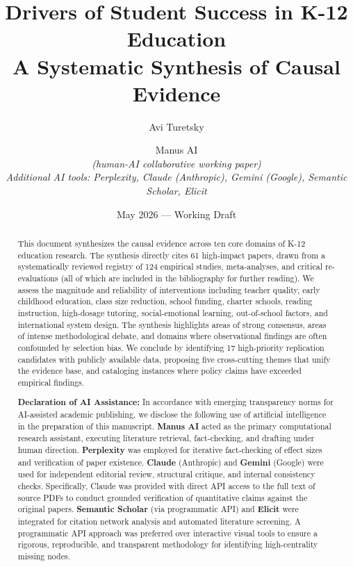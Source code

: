 \documentclass[12pt,letterpaper]{article}
\title{\textbf{Drivers of Student Success in K-12 Education}\\[0.5em]
\Large A Systematic Synthesis of Causal Evidence}
\author{
  Avi Turetsky \and Manus AI \\
  \vspace{0.5em}
  \small\textit{(human-AI collaborative working paper)} \\
  \vspace{1em}
  \small\textit{Additional AI tools: Perplexity, Claude (Anthropic), Gemini (Google), Semantic Scholar, Elicit}
}
\date{May 2026 --- Working Draft}
\begin{document}

\maketitle
\thispagestyle{empty}

\begin{abstract}
\noindent This document synthesizes the causal evidence across ten core domains of K-12 education research. The synthesis directly cites 61 high-impact papers, drawn from a systematically reviewed registry of 124 empirical studies, meta-analyses, and critical re-evaluations (all of which are included in the bibliography for further reading). We assess the magnitude and reliability of interventions including teacher quality, early childhood education, class size reduction, school funding, charter schools, reading instruction, high-dosage tutoring, social-emotional learning, out-of-school factors, and international system design. The synthesis highlights areas of strong consensus, areas of intense methodological debate, and domains where observational findings are often confounded by selection bias. We conclude by identifying 17 high-priority replication candidates with publicly available data, proposing five cross-cutting themes that unify the evidence base, and cataloging instances where policy claims have exceeded empirical findings.

\vspace{1em}
\noindent \textbf{Declaration of AI Assistance:} In accordance with emerging transparency norms for AI-assisted academic publishing, we disclose the following use of artificial intelligence in the preparation of this manuscript. \textbf{Manus AI} acted as the primary computational research assistant, executing literature retrieval, fact-checking, and drafting under human direction. \textbf{Perplexity} was employed for iterative fact-checking of effect sizes and verification of paper existence. \textbf{Claude} (Anthropic) and \textbf{Gemini} (Google) were used for independent editorial review, structural critique, and internal consistency checks. Specifically, Claude was provided with direct API access to the full text of source PDFs to conduct grounded verification of quantitative claims against the original papers. \textbf{Semantic Scholar} (via programmatic API) and \textbf{Elicit} were integrated for citation network analysis and automated literature screening. A programmatic API approach was preferred over interactive visual tools to ensure a rigorous, reproducible, and transparent methodology for identifying high-centrality missing nodes.
\end{abstract}
\end{document}
